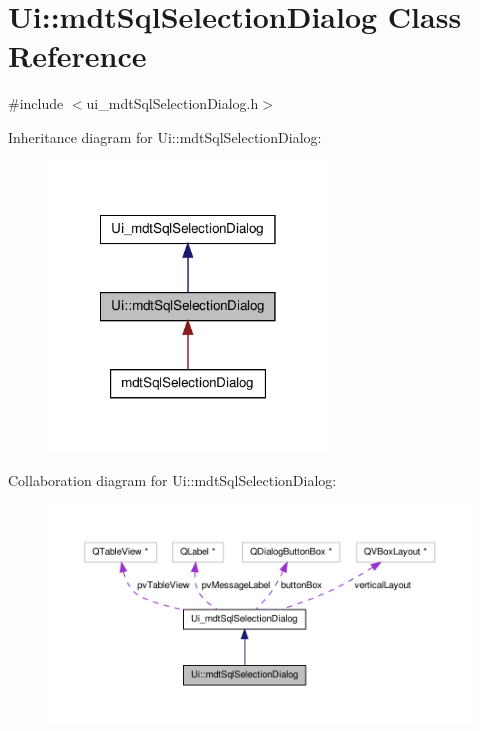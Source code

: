 \hypertarget{class_ui_1_1mdt_sql_selection_dialog}{\section{Ui\-:\-:mdt\-Sql\-Selection\-Dialog Class Reference}
\label{class_ui_1_1mdt_sql_selection_dialog}
}


{\ttfamily \#include $<$ui\-\_\-mdt\-Sql\-Selection\-Dialog.\-h$>$}



Inheritance diagram for Ui\-:\-:mdt\-Sql\-Selection\-Dialog\-:\nopagebreak
\begin{figure}[H]
\begin{center}
\leavevmode
\includegraphics[width=210pt]{class_ui_1_1mdt_sql_selection_dialog__inherit__graph}
\end{center}
\end{figure}


Collaboration diagram for Ui\-:\-:mdt\-Sql\-Selection\-Dialog\-:\nopagebreak
\begin{figure}[H]
\begin{center}
\leavevmode
\includegraphics[width=350pt]{class_ui_1_1mdt_sql_selection_dialog__coll__graph}
\end{center}
\end{figure}
